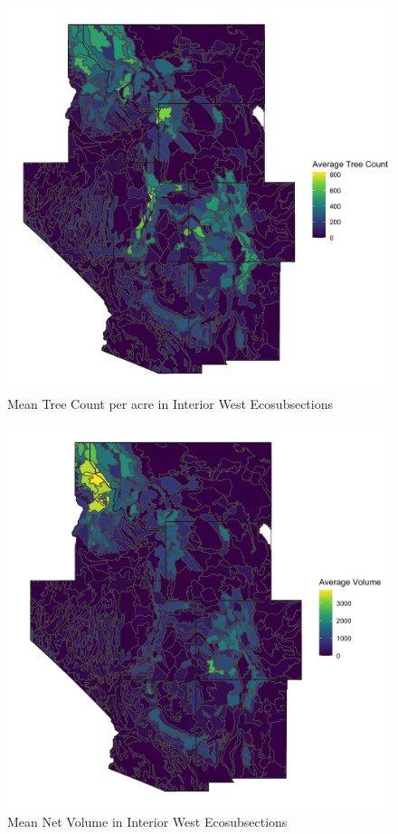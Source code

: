 \documentclass[12pt,twoside]{reedthesis}
\begin{document}
\begin{figure}

{\centering \includegraphics[width=0.65\linewidth]{figure/count} 

}

\caption{Mean Tree Count per acre in Interior West Ecosubsections}\label{fig:unnamed-chunk-8}
\end{figure}
\begin{figure}

{\centering \includegraphics[width=0.65\linewidth]{figure/voln} 

}

\caption{Mean Net Volume in Interior West Ecosubsections}\label{fig:unnamed-chunk-9}
\end{figure}
\end{document}
